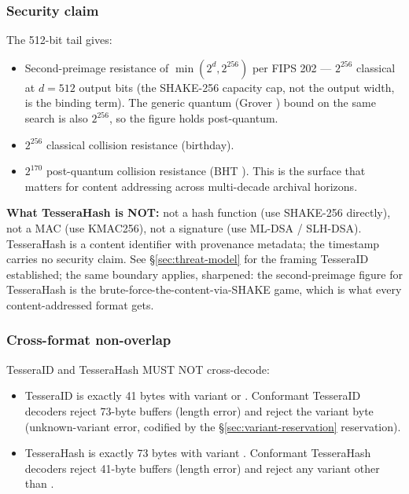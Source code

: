 \subsubsection{Security claim}

The 512-bit tail gives:
\begin{itemize}
  \item Second-preimage resistance of $\min(2^d, 2^{256})$ per FIPS 202 \citep{fips202} --- $2^{256}$ classical at $d = 512$ output bits (the SHAKE-256 capacity cap, not the output width, is the binding term). The generic quantum (Grover \citep{grover1996}) bound on the same search is also $2^{256}$, so the figure holds post-quantum.
  \item $2^{256}$ classical collision resistance (birthday).
  \item $2^{170}$ post-quantum collision resistance (BHT \citep{bht1998}). This is the surface that matters for content addressing across multi-decade archival horizons.
\end{itemize}

\textbf{What TesseraHash is NOT:} not a hash function (use SHAKE-256 directly), not a MAC (use KMAC256), not a signature (use ML-DSA / SLH-DSA). TesseraHash is a content identifier with provenance metadata; the timestamp carries no security claim. See §\ref{sec:threat-model} for the framing TesseraID established; the same boundary applies, sharpened: the second-preimage figure for TesseraHash is the brute-force-the-content-via-SHAKE game, which is what every content-addressed format gets.

\subsubsection{Cross-format non-overlap}

TesseraID and TesseraHash MUST NOT cross-decode:
\begin{itemize}
  \item TesseraID is exactly 41 bytes with variant  or . Conformant TesseraID decoders reject 73-byte buffers (length error) and reject the  variant byte (unknown-variant error, codified by the §\ref{sec:variant-reservation} reservation).
  \item TesseraHash is exactly 73 bytes with variant . Conformant TesseraHash decoders reject 41-byte buffers (length error) and reject any variant other than .
\end{itemize}

